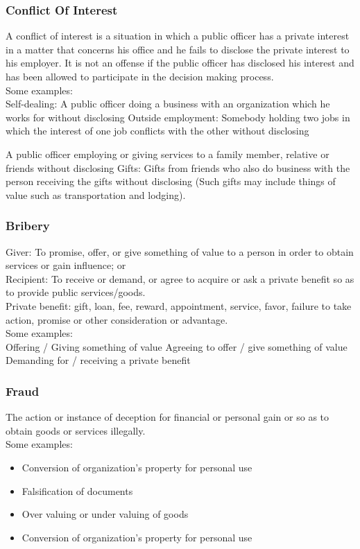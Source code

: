 \subsubsection{Conflict Of Interest}

A conflict of interest is a situation in which a public officer has a private interest in a matter that concerns his office and he fails to disclose the private interest to his employer.
It is not an offense if the public officer has disclosed his interest and has been allowed to participate in the decision making process.\\
Some examples:\\
Self-dealing: A public officer doing a business with an organization which he works for without disclosing
Outside employment: Somebody holding two jobs in which the interest of one job conflicts with the other without disclosing

A public officer employing or giving services to a family member, relative or friends without disclosing
Gifts: Gifts from friends who also do business with the person receiving the gifts without disclosing (Such gifts may include things of value such as transportation and lodging).


\subsubsection{Bribery}
Giver: To promise, offer, or give something of value to a person in order to obtain services or gain influence; or\\
Recipient: To receive or demand, or agree to acquire or ask a private benefit so as to provide public services/goods.\\
Private benefit: gift, loan, fee, reward, appointment, service, favor, failure to take action, promise or other consideration or advantage.\\
Some examples:\\
Offering / Giving something of value
Agreeing to offer / give something of value
Demanding for / receiving a private benefit
\subsubsection{Fraud}
The action or instance of deception for financial or personal gain or so as to obtain goods or services illegally.\\
Some examples:\\

\begin{itemize}
	\item Conversion of organization’s property for personal use
	\item Falsification of documents
	\item Over valuing or under valuing of goods
	\item Conversion of organization’s property for personal use
\end{itemize}

